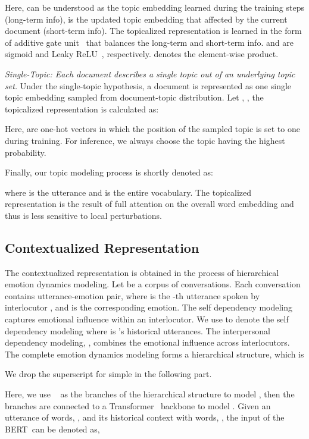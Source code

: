 \documentclass{ecai}
\def \BERT {\mbox{BERT}}
\begin{document}
Here,  can be understood as the topic embedding learned during the training steps (long-term info),  is the updated topic embedding that affected by the current document (short-term info). The topicalized representation  is learned in the form of additive gate unit~\cite{arevalo2020gated} that balances the long-term and short-term info.  and  are sigmoid and Leaky ReLU~\cite{xu2015empirical}, respectively.  denotes the element-wise product. 

\textit{Single-Topic: \label{hyp:second} Each document describes a single topic out of an underlying topic set.} Under the single-topic hypothesis, a document is represented as one single topic embedding sampled from document-topic distribution. Let , , the topicalized representation is calculated as:

Here,  are one-hot vectors in which the position of the sampled topic is set to one during training. For inference, we always choose the topic having the highest probability.

Finally, our topic modeling process is shortly denoted as:

where  is the utterance and  is the entire vocabulary. The topicalized representation is the result of full attention on the overall word embedding and thus is less sensitive to local perturbations.

\subsection{Contextualized Representation}
\label{sec:con_rep}
The contextualized representation is obtained in the process of hierarchical emotion dynamics modeling. Let  be a corpus of  conversations. Each conversation  contains  utterance-emotion pair, where  is the -th utterance spoken by interlocutor , and  is the corresponding emotion. The self dependency modeling captures emotional influence within an interlocutor. We use  to denote the self dependency modeling where  is 's historical utterances. The interpersonal dependency modeling, , combines the emotional influence across interlocutors. The complete emotion dynamics modeling forms a hierarchical structure, which is

We drop the superscript  for simple in the following part.

Here, we use ~\cite{devlin2019bert} as the branches of the hierarchical structure to model , then the branches are connected to a Transformer~\cite{vaswani2017attention} backbone to model . Given an utterance of  words, , and its historical context with  words, , the input of the \BERT~can be denoted as,
\end{document}
